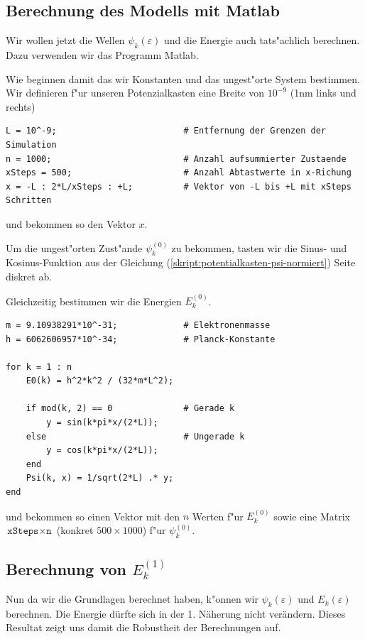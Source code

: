 \begin{refsection}
\subsection{Berechnung des Modells mit Matlab}

Wir wollen jetzt die Wellen $\psi_k(\varepsilon)$ und die Energie auch tats"achlich berechnen.
Dazu verwenden wir das Programm Matlab.

Wie beginnen damit das wir Konstanten und das ungest"orte System bestimmen.
Wir definieren f"ur unseren Potenzialkasten eine Breite von $10^{-9}$ (1nm links und rechts)
\begin{lstlisting}[style=Matlab]
L = 10^-9;                         # Entfernung der Grenzen der Simulation
n = 1000;                          # Anzahl aufsummierter Zustaende
xSteps = 500;                      # Anzahl Abtastwerte in x-Richung
x = -L : 2*L/xSteps : +L;          # Vektor von -L bis +L mit xSteps Schritten
\end{lstlisting}
und bekommen so den Vektor $x$.

Um die ungest"orten Zust"ande $\psi_k^{(0)}$ zu bekommen, tasten wir die Sinus- und Kosinus-Funktion 
aus der Gleichung (\ref{skript:potentialkasten-psi-normiert}) Seite \pageref{skript:potentialkasten-psi-normiert} diskret ab.

Gleichzeitig bestimmen wir die Energien $E_k^{(0)}$.
\begin{lstlisting}[style=Matlab]
m = 9.10938291*10^-31;             # Elektronenmasse
h = 6062606957*10^-34;             # Planck-Konstante

for k = 1 : n
    E0(k) = h^2*k^2 / (32*m*L^2);
    
    if mod(k, 2) == 0              # Gerade k
        y = sin(k*pi*x/(2*L));
    else                           # Ungerade k
        y = cos(k*pi*x/(2*L));
    end
    Psi(k, x) = 1/sqrt(2*L) .* y;
end
\end{lstlisting}
und bekommen so einen Vektor mit den $n$ Werten f"ur $E_k^{(0)}$
sowie eine Matrix $\texttt{xSteps} \times \texttt{n}$ (konkret $500 \times 1000$) f"ur $\psi_k^{(0)}$.

\subsection{Berechnung von $E_k^{(1)}$}

Nun da wir die Grundlagen berechnet haben, k"onnen wir $\psi_k(\varepsilon)$ und 
$E_k(\varepsilon)$ berechnen. Die Energie d\"urfte sich in der 1. N\"aherung nicht ver\"andern.
Dieses Resultat zeigt uns damit die Robustheit der Berechnungen auf.


\end{refsection}
